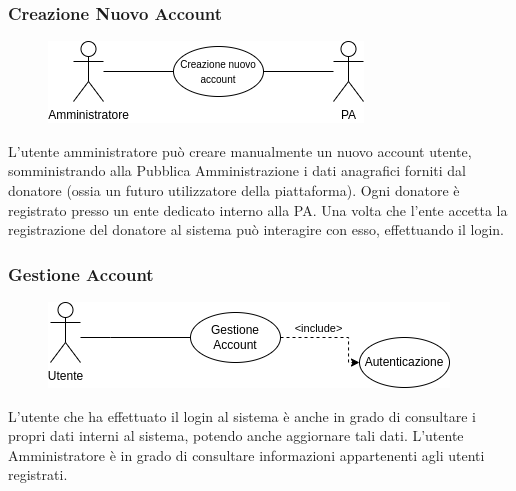 \documentclass{article}
\begin{document}
\subsubsection{Creazione Nuovo Account}\label{rf_7}
\begin{description}

	\begin{figure}[htp]
	\centering
	\includegraphics[]{rf7.png}
	\end{figure}

    \item L'utente amministratore può creare manualmente un nuovo account utente, somministrando alla Pubblica Amministrazione i dati anagrafici forniti dal donatore (ossia un futuro utilizzatore della piattaforma). Ogni donatore è registrato presso un ente dedicato interno alla PA. Una volta che l'ente accetta la registrazione del donatore al sistema può interagire con esso, effettuando il login.
\end{description}

\clearpage

\renewcommand\thesubsubsection{RF 8}
\subsubsection{Gestione Account}\label{rf_8}
\begin{description}

	\begin{figure}[htp]
	\centering
	\includegraphics[]{rf8.png}
	\end{figure}	
	
    \item L'utente che ha effettuato il login al sistema è anche in grado di consultare i propri dati interni al sistema, potendo anche aggiornare tali dati. L'utente Amministratore è in grado di consultare informazioni appartenenti agli utenti registrati.
\end{description}

\renewcommand\thesubsubsection{RF 9}
\end{document}
